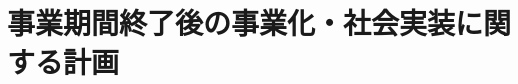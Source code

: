 \documentclass[uplatex]{jsarticle}
\begin{document}

\section{事業期間終了後の事業化・社会実装に関する計画}



\end{document}
